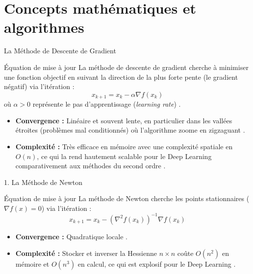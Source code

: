 \documentclass{beamer}
\begin{document}
\section{Concepts mathématiques et algorithmes}
\begin{frame}{La Méthode de Descente de Gradient}
    \begin{block}{Équation de mise à jour}
        La méthode de descente de gradient cherche à minimiser une fonction objectif en suivant la direction de la plus forte pente (le gradient négatif) \cite{synapsara_video} via l'itération :
        \begin{equation}
            x_{k+1} = x_k - \alpha \nabla f(x_k)
        \end{equation}
        où $\alpha > 0$ représente le pas d'apprentissage (\emph{learning rate}) \cite{synapsara_video}.
    \end{block}
    \begin{itemize}
        \item \textbf{Convergence :} Linéaire et souvent lente, en particulier dans les vallées étroites (problèmes mal conditionnés) où l'algorithme zoome en zigzaguant \cite{synapsara_video}.
        \item \textbf{Complexité :} Très efficace en mémoire avec une complexité spatiale en $O(n)$, ce qui la rend hautement scalable pour le Deep Learning comparativement aux méthodes du second ordre \cite{synapsara_video}.
    \end{itemize}
\end{frame}

\begin{frame}{1. La Méthode de Newton}
    \begin{block}{Équation de mise à jour}
        La méthode de Newton cherche les points stationnaires ($\nabla f(x) = 0$) via l'itération \cite{gramfort_quasi_newton} :
        \begin{equation}
            x_{k+1} = x_k - \left(\nabla^2 f(x_k)\right)^{-1} \nabla f(x_k)
        \end{equation}
    \end{block}
    \begin{itemize}
        \item \textbf{Convergence :} Quadratique locale \cite{gramfort_quasi_newton}.
        \item \textbf{Complexité :} Stocker et inverser la Hessienne $n \times n$ coûte $O(n^2)$ en mémoire et $O(n^3)$ en calcul, ce qui est explosif pour le Deep Learning \cite{synapsara_video}.
    \end{itemize}
\end{frame}
\end{document}
